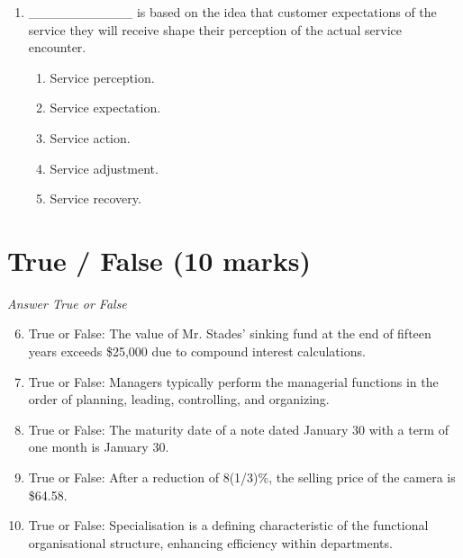 \documentclass[12pt]{article}
\begin{document}
\begin{enumerate}[label=\arabic*.]
\begin{enumerate}[label=(\alph*)]
    \item 72.8
    \item 65.9
    \item 85.0
    \item 70.3
    \item 83.7
\end{enumerate}
\item \_\_\_\_\_\_\_\_\_\_\_ is based on the idea that customer expectations of the service they will receive shape their perception of the actual service encounter.
\begin{enumerate}[label=(\alph*)]
    \item Service perception.
    \item Service expectation.
    \item Service action.
    \item Service adjustment.
    \item Service recovery.
\end{enumerate}
\end{enumerate}

\section*{True / False (10 marks)}
\textit{Answer True or False}
\begin{enumerate}[label=\arabic*.]
\setcounter{enumi}{5}
\item True or False: The value of Mr. Stades' sinking fund at the end of fifteen years exceeds \$25,000 due to compound interest calculations.
\item True or False: Managers typically perform the managerial functions in the order of planning, leading, controlling, and organizing.
\item True or False: The maturity date of a note dated January 30 with a term of one month is January 30.
\item True or False: After a reduction of 8(1/3)\%, the selling price of the camera is \$64.58.
\item True or False: Specialisation is a defining characteristic of the functional organisational structure, enhancing efficiency within departments.
\end{enumerate}
\end{document}
